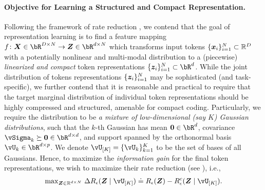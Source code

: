 \documentclass[../../book-main.tex]{subfiles}
\begin{document}
 
\paragraph{Objective for Learning a Structured and Compact Representation.}
Following the framework of rate reduction , we contend
that the goal of representation learning is to find a feature mapping \(f
\colon \X \in \bR^{D \times N} \to \Z\in \bR^{d \times N}\) which transforms input tokens \(\{\bm x_i\}_{i=1}^N \subset \mathbb{R}^D\) with a potentially nonlinear and multi-modal distribution to a (piecewise) \textit{linearized and compact} token representations \(\{\bm z_i\}_{i=1}^N \subset \bR^{d}\). While the joint distribution of tokens representations \(\{\bm{z}_{i}\}_{i = 1}^{N}\) may be sophisticated (and task-specific), we further contend that it is reasonable and practical to
require that the target marginal distribution of individual token representations should be highly compressed and structured, amenable for compact coding. Particularly, we require the distribution to be \textit{a mixture of low-dimensional (say \(K\)) Gaussian
distributions}, such that the \(k\)-th Gaussian has mean \(\Zero \in \bR^{d}\), covariance \(\vSigma_{k} \succeq \Zero \in \bR^{d \times d}\), and support spanned by the orthonormal basis \(\vU_{k} \in \bR^{d \times p}\). 
We denote $\vU_{[K]} = \{\vU_k\}_{k=1}^K$ to be the set of bases of all Gaussians. Hence, to maximize the \textit{information gain} \cite{ma2022principles} for the final token representations, we wish to maximize their rate reduction (see ), i.e., 
\begin{align}\label{eq:rate reduction}
    \mathrm{max}_{\bm Z \in \R^{d\times N}}\ \Delta R_{\epsilon}(\Z \mid \vU_{[K]}) \doteq R_{\epsilon}(\Z) - R^c_{\epsilon}(\Z \mid \vU_{[K]}).
\end{align}
\end{document}
